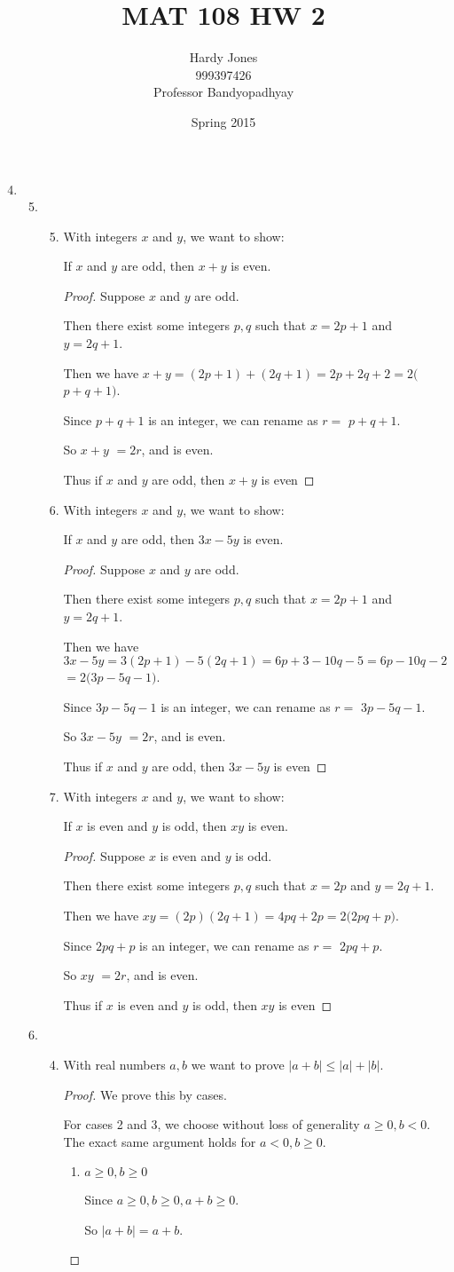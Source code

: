 \documentclass[12pt,letterpaper]{article}
\title{MAT 108 HW 2\vspace{-2ex}}
\author{Hardy Jones\\
        999397426\\
        Professor Bandyopadhyay\vspace{-2ex}}
\date{Spring 2015}
\newcommand*\directproofsimple[6]{
  With integers $x$ and $y$, we want to show:

  If #1, then #2 is even.

  \begin{proof}
    Suppose #1.

    Then there exist some integers $p, q$ such that #3 and #4.

    Then we have #5$ = 2($#6$)$.

    Since #6 is an integer, we can rename as $r = $ #6.

    So #2 $ = 2r$, and is even.

    Thus if #1, then #2 is even
  \end{proof}
}
\begin{document}
  \maketitle

  \begin{enumerate}
    \setcounter{enumi}{3}
    \item
      \begin{enumerate}
        \setcounter{enumii}{4}
        \item
          \begin{enumerate}
            \setcounter{enumiii}{4}
            \item
              \directproofsimple
                {$x$ and $y$ are odd}
                {$x + y$}
                {$x = 2p + 1$}
                {$y = 2q + 1$}
                {$x + y = (2p + 1) + (2q + 1) = 2p + 2q + 2$}
                {$p + q + 1$}
            \item
              \directproofsimple
                {$x$ and $y$ are odd}
                {$3x - 5y$}
                {$x = 2p + 1$}
                {$y = 2q + 1$}
                {$3x - 5y = 3(2p + 1) - 5(2q + 1) = 6p + 3 - 10q - 5 = 6p - 10q - 2$}
                {$3p - 5q - 1$}
            \setcounter{enumiii}{8}
            \item
              \directproofsimple
                {$x$ is even and $y$ is odd}
                {$xy$}
                {$x = 2p$}
                {$y = 2q + 1$}
                {$xy = (2p)(2q + 1) = 4pq + 2p$}
                {$2pq + p$}
          \end{enumerate}
        \item
          \begin{enumerate}
            \setcounter{enumiii}{3}
            \item
              With real numbers $a, b$ we want to prove $|a + b| \leq |a| + |b|$.
              \begin{proof}
                We prove this by cases.

                For cases 2 and 3,
                we choose without loss of generality $a \geq 0, b < 0$.
                The exact same argument holds for $a < 0, b \geq 0$.
                \begin{enumerate}[label=Case \arabic*]
                  \item $a \geq 0, b \geq 0$

                    Since $a \geq 0, b \geq 0, a + b \geq 0$.

                    So $|a + b| = a + b$.


\end{enumerate}
\end{proof}
\end{enumerate}
\end{enumerate}
\end{enumerate}
\end{document}
